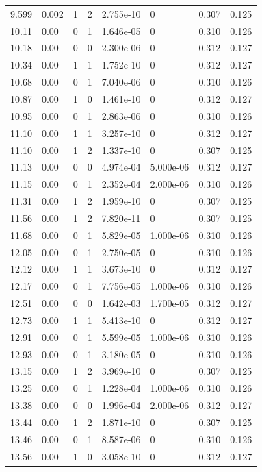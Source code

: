 \documentclass[preview]{standalone}
\begin{document}
{{{\begin{tabular}{L{1.2cm}C{1.2cm} C{0.3cm}C{0.5cm} C{1.4cm}C{1.4cm} C{1.4cm}C{1.4cm}}
  9.599  &  0.002  & 1     &  2 &  2.755e-10  & 0  & 0.307 &  0.125   \\ 
  10.11  &  0.00  & 0     &  1 &  1.646e-05  & 0  & 0.310 &  0.126   \\ 
  10.18  &  0.00  & 0     &  0 &  2.300e-06  & 0  & 0.312 &  0.127   \\ 
  10.34  &  0.00  & 1     &  1 &  1.752e-10  & 0  & 0.312 &  0.127   \\ 
  10.68  &  0.00  & 0     &  1 &  7.040e-06  & 0  & 0.310 &  0.126   \\ 
  10.87  &  0.00  & 1     &  0 &  1.461e-10  & 0  & 0.312 &  0.127   \\ 
  10.95  &  0.00  & 0     &  1 &  2.863e-06  & 0  & 0.310 &  0.126   \\ 
  11.10  &  0.00  & 1     &  1 &  3.257e-10  & 0  & 0.312 &  0.127   \\ 
  11.10  &  0.00  & 1     &  2 &  1.337e-10  & 0  & 0.307 &  0.125   \\ 
  11.13  &  0.00  & 0     &  0 &  4.974e-04  & 5.000e-06  & 0.312 &  0.127   \\ 
  11.15  &  0.00  & 0     &  1 &  2.352e-04  & 2.000e-06  & 0.310 &  0.126   \\ 
  11.31  &  0.00  & 1     &  2 &  1.959e-10  & 0  & 0.307 &  0.125   \\ 
  11.56  &  0.00  & 1     &  2 &  7.820e-11  & 0  & 0.307 &  0.125   \\ 
  11.68  &  0.00  & 0     &  1 &  5.829e-05  & 1.000e-06  & 0.310 &  0.126   \\ 
  12.05  &  0.00  & 0     &  1 &  2.750e-05  & 0  & 0.310 &  0.126   \\ 
  12.12  &  0.00  & 1     &  1 &  3.673e-10  & 0  & 0.312 &  0.127   \\ 
  12.17  &  0.00  & 0     &  1 &  7.756e-05  & 1.000e-06  & 0.310 &  0.126   \\ 
  12.51  &  0.00  & 0     &  0 &  1.642e-03  & 1.700e-05  & 0.312 &  0.127   \\ 
  12.73  &  0.00  & 1     &  1 &  5.413e-10  & 0  & 0.312 &  0.127   \\ 
  12.91  &  0.00  & 0     &  1 &  5.599e-05  & 1.000e-06  & 0.310 &  0.126   \\ 
  12.93  &  0.00  & 0     &  1 &  3.180e-05  & 0  & 0.310 &  0.126   \\ 
  13.15  &  0.00  & 1     &  2 &  3.969e-10  & 0  & 0.307 &  0.125   \\ 
  13.25  &  0.00  & 0     &  1 &  1.228e-04  & 1.000e-06  & 0.310 &  0.126   \\ 
  13.38  &  0.00  & 0     &  0 &  1.996e-04  & 2.000e-06  & 0.312 &  0.127   \\ 
  13.44  &  0.00  & 1     &  2 &  1.871e-10  & 0  & 0.307 &  0.125   \\ 
  13.46  &  0.00  & 0     &  1 &  8.587e-06  & 0  & 0.310 &  0.126   \\ 
  13.56  &  0.00  & 1     &  0 &  3.058e-10  & 0  & 0.312 &  0.127   \\ 
\hline 
\end{tabular} 

}}}
\end{document}
